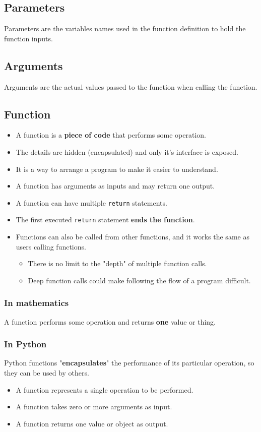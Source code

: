 \documentclass[11pt]{article}
\begin{document}
\subsection{Parameters}
\label{sec:org0a0cf54}
Parameters are the variables names used in the function definition to hold the function inputs.

\subsection{Arguments}
\label{sec:org539be3b}
Arguments are the actual values passed to the function when calling the function.

\subsection{Function}
\label{sec:org512fc4e}
\begin{itemize}
\item A function is a \textbf{piece of code} that performs some operation.
\item The details are hidden (encapsulated) and only it's interface is exposed.
\item It is a way to arrange a program to make it easier to understand.
\item A function has arguments as inputs and may return one output.
\item A function can have multiple \texttt{return} statements.
\item The first executed \texttt{return} statement \textbf{ends the function}.
\item Functions can also be called from other functions, and it works the same as users calling functions.
\begin{itemize}
\item There is no limit to the "depth" of multiple function calls.
\item Deep function calls could make following the flow of a program difficult.
\end{itemize}
\end{itemize}

\subsubsection{In mathematics}
\label{sec:org6132aca}
A function performs some operation and returns \textbf{one} value or thing.

\subsubsection{In Python}
\label{sec:org82082f1}
Python functions "\textbf{encapsulates}" the performance of its particular operation, so they can be used by others.
\begin{itemize}
\item A function represents a single operation to be performed.
\item A function takes zero or more arguments as input.
\item A function returns one value or object as output.
\end{itemize}
\end{document}
